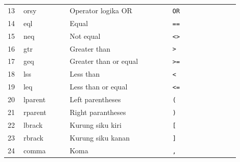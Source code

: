 \begin{center}
\begin{longtable}{p{0.06\linewidth} p{0.18\linewidth} p{0.40\linewidth} p{0.26\linewidth}}
        13 & orsy        & Operator logika OR                                                                                                          & \texttt{OR}                    \\
        14 & eql         & Equal                                                                                                                       & \texttt{==}                    \\
        15 & neq         & Not equal                                                                                                                   & \texttt{<>}                    \\
        16 & gtr         & Greater than                                                                                                                & \texttt{>}                     \\
        17 & geq         & Greater than or equal                                                                                                       & \texttt{>=}                    \\
        18 & lss         & Less than                                                                                                                   & \texttt{<}                     \\
        19 & leq         & Less than or equal                                                                                                          & \texttt{<=}                    \\
        20 & lparent     & Left parentheses                                                                                                            & \texttt{(}                     \\
        21 & rparent     & Right parantheses                                                                                                           & \texttt{)}                     \\
        22 & lbrack      & Kurung siku kiri                                                                                                            & \texttt{[}                     \\
        23 & rbrack      & Kurung siku kanan                                                                                                           & \texttt{]}                     \\
        24 & comma       & Koma                                                                                                                        & \texttt{,}                     \\

\end{longtable}
\end{center}
